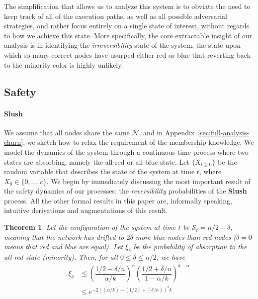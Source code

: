 \documentclass[letterpaper,twocolumn,10pt]{article}
\newtheorem{theorem}{Theorem}
\theoremstyle{definition}
\begin{document}
The simplification that allows us to analyze this system is to obviate the need to keep track of all of the execution paths, as well as all possible adversarial strategies, and rather focus entirely on a single state of interest, without regards to how we achieve this state. 
More specifically, the core extractable insight of our analysis is in identifying the \textit{irreversibility} state of the system, the state upon which so many correct nodes have usurped either red or blue that reverting back to the minority color is highly unlikely. 

\subsection{Safety}

\paragraph{Slush} 
We assume that
all nodes share the same $\mathcal{N}$, and in
Appendix~\ref{sec:full-analysis-churn}, we sketch how to relax the requirement of the membership knowledge.
We model the dynamics of the system through a continuous-time process where two states are absorbing, namely the all-red or all-blue state. Let $\{X_{t \geq 0}\}$ be the random variable that describes the state of the system at time $t$, where $X_0 \in \{0, \dots, c\}$.
We begin by immediately discussing the most important result of the safety dynamics of our processes: the \emph{reversibility} probabilities of the \textbf{Slush} process. All the other formal results in this paper are, informally speaking, intuitive derivations and augmentations of this result. 

\begin{theorem}
Let the configuration of the system at time $t$ be $\mathcal{S}_t = n/2 + \delta$, meaning that the network has drifted to $2\delta$ more blue nodes than red nodes ($\delta = 0$ means that red and blue are equal). Let $\xi_\delta$ be the probability of absorption to the all-red state (minority). Then, for all $0 \leq \delta \leq n/2$, we have 
\begin{equation}
\begin{split}
    \xi_\delta &\leq \left(\dfrac{1/2 - \delta/n}{\alpha/k}\right)^{\alpha}\left(\dfrac{1/2 + \delta/n}{1- \alpha/k}\right)^{k-\alpha}\\
    &\leq e^{-2((\alpha/k) - (1/2) + (\delta/n))^2 k}
\end{split}
\end{equation}
\end{theorem}
\end{document}
